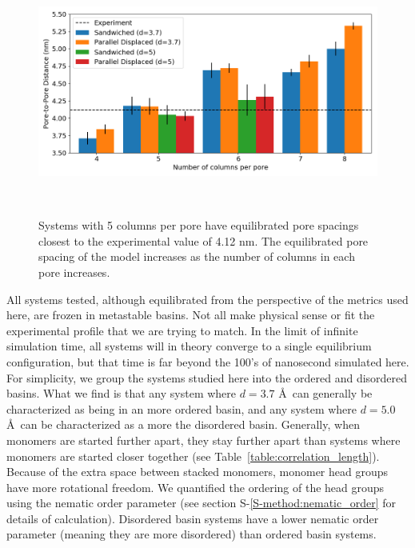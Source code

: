 \documentclass[journal=jpcbfk,manuscript=article]{achemso}
\begin{document}
  \begin{figure}[!htb]
	\centering
	\includegraphics[width=\linewidth]{p2p.png}
	\caption{Systems with 5 columns per pore have equilibrated pore spacings closest to
			 the experimental value of 4.12 nm. The equilibrated pore spacing of the model 	
			 increases as the number of columns in each pore increases.}~\label{fig:p2p}
  \end{figure}  
  
  All systems tested, although equilibrated from the perspective of the metrics used here, are
  frozen in metastable basins. Not all make physical sense or fit the experimental profile that 
  we are trying to match. In the limit of infinite simulation time, all systems will in theory 
  converge to a single equilibrium configuration, but that time is far beyond the 100's of 
  nanosecond simulated here. For simplicity, we group the systems studied here into the ordered
  and disordered basins. What we find is that any system where $\mathit{d}=3.7$ \AA~can generally 
  be characterized as being in an
  more ordered basin, and any system where $\mathit{d}=5.0$ \AA~can be characterized as a more the disordered basin.
  Generally, when monomers are started further apart, they stay further apart than systems where
  monomers are started closer together (see Table~\ref{table:correlation_length}). Because of the
  extra space between stacked monomers, monomer head groups have more rotational freedom. We
  quantified the ordering of the head groups using the nematic order parameter (see section S-\ref{S-method:nematic_order} for details of calculation). 
  Disordered basin systems have a lower nematic order parameter (meaning they are more disordered) 
  than ordered basin systems.

  
\end{document}
